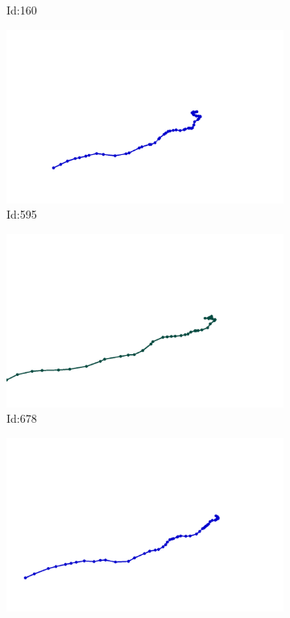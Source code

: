 \documentclass[12pt,twoside]{report}
\begin{document}
\begin{figure}
\begin{subfigure}[b]{0.20\textwidth}
\caption{Id:160}
\end{subfigure}
\begin{subfigure}[b]{0.20\textwidth}
\centering
\includegraphics[width=\textwidth]{../../trajectories/595.png}
\caption{Id:595}
\end{subfigure}
\begin{subfigure}[b]{0.20\textwidth}
\centering
\includegraphics[width=\textwidth]{../../trajectories/678.png}
\caption{Id:678}
\end{subfigure}
\begin{subfigure}[b]{0.20\textwidth}
\centering
\includegraphics[width=\textwidth]{../../trajectories/763.png}

\end{subfigure}
\end{figure}
\end{document}
